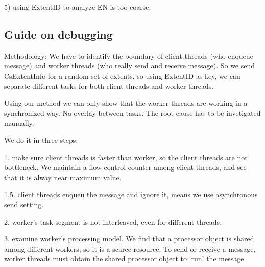 5) using ExtentID to analyze EN is too coarse.

\subsection{Guide on debugging}

Methodology: We have to identify the boundary of client
threads (who enqueue message) and worker threads (who really
send and receive message). So we send CsExtentInfo for a
random set of extents, so using ExtentID as key, we can
separate different tasks for both client threads and worker
threads.

Using our method we can only show that the worker threads
are working in a synchronized way. No overlay between tasks.
The root cause has to be invetigated manually.

We do it in three steps:

1. make sure client threads is faster than worker, so the
client threads are not bottleneck. We
maintain a flow control counter among client threads, and
see that it is alway near maximum value.

1.5. client threads enqueu the message and ignore it, means
we use asynchronous send setting.

2. worker's task segment is not interleaved, even for
different threads.

3. examine worker's processing model. We find that a
processor object is shared among different workers, so it is
a scarce resource. To send or receive a message, worker
threads must obtain the shared processor object to `run' the
message.

